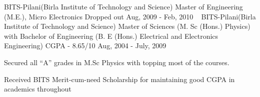 

\begin{cventries}


  
    \cventry
    {BITS-Pilani(Birla Institute of Technology and Science)} %
    {Master of Engineering (M.E.), Micro Electronics} %
    {Dropped out} %
    {Aug, 2009 - Feb, 2010} %
    {~}
    \cventry
    {BITS-Pilani(Birla Institute of Technology and Science)} %
    {Master of Sciences (M. Sc (Hons.) Physics) with Bachelor of Engineering (B. E (Hons.) Electrical and Electronics Engineering)} %
    {CGPA - 8.65/10} %
    {Aug, 2004 - July, 2009} %
    {
      \begin{cvitems} %
        \item {Secured all “A” grades in M.Sc Physics with topping most of the courses.}
	\item {Received BITS Merit-cum-need Scholarship for maintaining good CGPA in academics throughout}
      \end{cvitems}
    }

\end{cventries}
